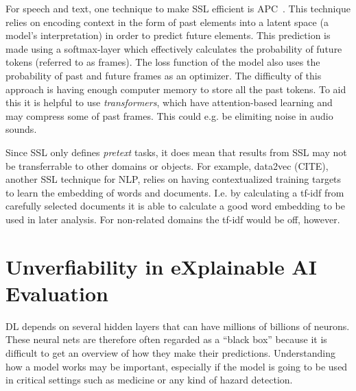 \documentclass[10pt,twocolumn,letterpaper]{article}
\begin{document}
For speech and text, one technique to make \gls{SSL} efficient is \gls{APC}~\cite{chung2020generative}. This technique relies on encoding context in the form of past elements into a latent space (a model's interpretation) in order to predict future elements. This prediction is made using a softmax-layer which effectively calculates the probability of future tokens (referred to as frames). The loss function of the model also uses the probability of past and future frames as an optimizer. The difficulty of this approach is having enough computer memory to store all the past tokens. To aid this it is helpful to use \textit{transformers}, which have attention-based learning and may compress some of past frames. This could e.g. be elimiting noise in audio sounds.

Since \gls{SSL} only defines \textit{pretext} tasks, it does mean that results from \gls{SSL} may not be transferrable to other domains or objects. For example, data2vec (CITE), another \gls{SSL} technique for \gls{NLP}, relies on having contextualized training targets to learn the embedding of words and documents. I.e. by calculating a \gls{tf-idf} from carefully selected documents it is able to calculate a good word embedding to be used in later analysis. For non-related domains the \gls{tf-idf} would be off, however. 



\section{Unverfiability in eXplainable AI Evaluation}\label{sec:xai}

\gls{DL} depends on several hidden layers that can have millions of billions of neurons. These neural nets are therefore often regarded as a ``black box'' because it is difficult to get an overview of how they make their predictions. Understanding how a model works may be important, especially if the model is going to be used in critical settings such as medicine or any kind of hazard detection. 
\end{document}
